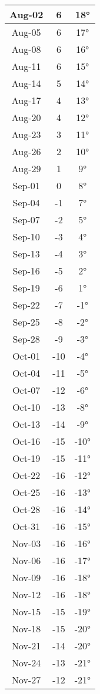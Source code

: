 \begin{footnotesize}
\begin{minipage}{0.5\textwidth}
\begin{tabular}{c | c | c}
Aug-02 & 6 & 18°\\\hline
Aug-05 & 6 & 17°\\\hline
Aug-08 & 6 & 16°\\\hline
Aug-11 & 6 & 15°\\\hline
Aug-14 & 5 & 14°\\\hline
Aug-17 & 4 & 13°\\\hline
Aug-20 & 4 & 12°\\\hline
Aug-23 & 3 & 11°\\\hline
Aug-26 & 2 & 10°\\\hline
Aug-29 & 1 & 9°\\\hline
Sep-01 & 0 & 8°\\\hline
Sep-04 & -1 & 7°\\\hline
Sep-07 & -2 & 5°\\\hline
Sep-10 & -3 & 4°\\\hline
Sep-13 & -4 & 3°\\\hline
Sep-16 & -5 & 2°\\\hline
Sep-19 & -6 & 1°\\\hline
Sep-22 & -7 & -1°\\\hline
Sep-25 & -8 & -2°\\\hline
Sep-28 & -9 & -3°\\\hline
Oct-01 & -10 & -4°\\\hline
Oct-04 & -11 & -5°\\\hline
Oct-07 & -12 & -6°\\\hline
Oct-10 & -13 & -8°\\\hline
Oct-13 & -14 & -9°\\\hline
Oct-16 & -15 & -10°\\\hline
Oct-19 & -15 & -11°\\\hline
Oct-22 & -16 & -12°\\\hline
Oct-25 & -16 & -13°\\\hline
Oct-28 & -16 & -14°\\\hline
Oct-31 & -16 & -15°\\\hline
Nov-03 & -16 & -16°\\\hline
Nov-06 & -16 & -17°\\\hline
Nov-09 & -16 & -18°\\\hline
Nov-12 & -16 & -18°\\\hline
Nov-15 & -15 & -19°\\\hline
Nov-18 & -15 & -20°\\\hline
Nov-21 & -14 & -20°\\\hline
Nov-24 & -13 & -21°\\\hline
Nov-27 & -12 & -21°\\\hline

\end{tabular}
\end{minipage}
\end{footnotesize}

